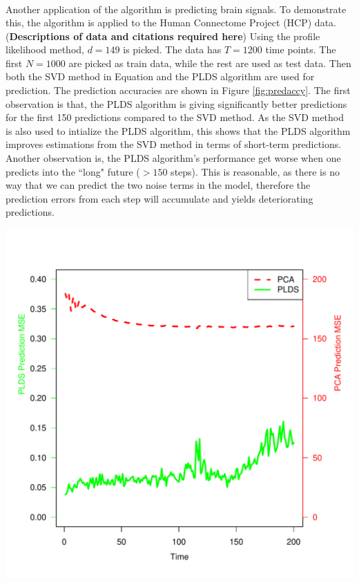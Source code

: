 \documentclass[fleqn]{article}
\let\oldref\ref
\renewcommand{\ref}[1]{(\oldref{#1})}
\begin{document}
\begin{center}
\[\begin{array}{lll}
\end{array}
\]
\label{fig:3d}
\end{center}

Another application of the algorithm is predicting brain signals. To demonstrate this, the algorithm is applied to the Human Connectome Project (HCP) data. (\textbf{Descriptions of data and citations required here}) Using the profile likelihood method, $d=149$ is picked. The data has $T=1200$ time points. The first $N = 1000$ are picked as train data, while the rest are used as test data. Then both the SVD method in Equation \label{eq:initial} and the PLDS algorithm are used for prediction. The prediction accuracies are shown in Figure \oldref{fig:predaccy}. The first observation is that, the PLDS algorithm is giving significantly better predictions for the first 150 predictions compared to the SVD method. As the SVD method is also used to intialize the PLDS algorithm, this shows that the PLDS algorithm improves estimations from the SVD method in terms of short-term predictions. Another observation is, the PLDS algorithm's performance get worse when one predicts into the ``long" future ($>150$ steps). This is reasonable, as there is no way that we can predict the two noise terms in the model, therefore the prediction errors from each step will accumulate and yields deteriorating predictions.

\begin{center}
\includegraphics[scale=0.5]{./figures/hcp_pred_accy.pdf}
\label{fig:predaccy}
\end{center}
\end{document}
